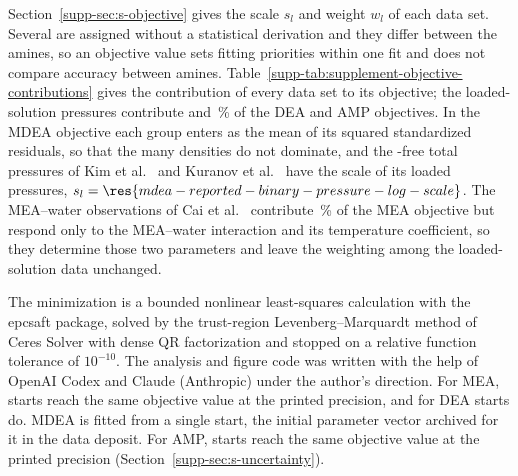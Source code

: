 Section~\ref{supp-sec:s-objective} gives the scale $s_l$ and weight $w_l$ of each data set.
Several are assigned without a statistical derivation and they differ between the amines, so an objective value sets fitting priorities within one fit and does not compare accuracy between amines.
Table~\ref{supp-tab:supplement-objective-contributions} gives the contribution of every data set to its objective; the loaded-solution pressures contribute  and \,\% of the DEA and AMP objectives.
In the MDEA objective each group enters as the mean of its squared standardized residuals, so that the many densities do not dominate, and the \COtwo-free total pressures of Kim et al.\ \cite{kimEbulliometricDeterminationVaporLiquid2008} and Kuranov et al.\ \cite{kuranovSolubilitySingleGases1996} have the scale of its loaded pressures, $s_l=\res{mdea-reported-binary-pressure-log-scale}$.
The MEA--water observations of Cai et al.\ \cite{caiBinaryIsobaricVaporLiquid1996} contribute \,\% of the MEA objective but respond only to the MEA--water interaction and its temperature coefficient, so they determine those two parameters and leave the weighting among the loaded-solution data unchanged.

The minimization is a bounded nonlinear least-squares calculation with the epcsaft package, solved by the trust-region Levenberg--Marquardt method of Ceres Solver \cite{agarwalCeresSolver2023} with dense QR factorization and stopped on a relative function tolerance of $10^{-10}$.
The analysis and figure code was written with the help of OpenAI Codex and Claude (Anthropic) under the author's direction.
For MEA,  starts reach the same objective value at the printed precision, and for DEA  starts do.
MDEA is fitted from a single start, the initial parameter vector archived for it in the data deposit.
For AMP,  starts reach the same objective value at the printed precision (Section~\ref{supp-sec:s-uncertainty}).

